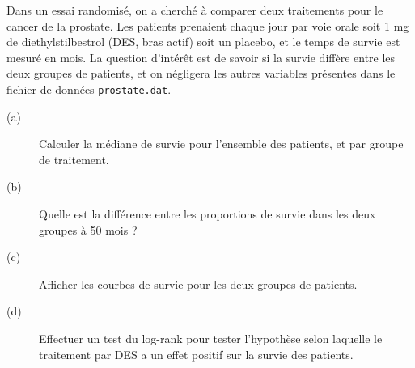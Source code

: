 \begin{exo}\label{exo:7.1}


\end{exo}

\begin{exo}\label{exo:7.2}
Dans un essai randomisé, on a cherché à comparer deux traitements pour le
cancer de la prostate. Les patients prenaient chaque jour par voie orale
soit 1 mg de diethylstilbestrol (DES, bras actif) soit un placebo, et le
temps de survie est mesuré en mois.\autocite{collett94} La question
d'intérêt est de savoir si la survie diffère entre les deux groupes de
patients, et on négligera les autres variables présentes dans le fichier de
données \texttt{prostate.dat}. 
\begin{description}
\item[(a)] Calculer la médiane de survie pour l'ensemble des patients, et
  par groupe de traitement.
\item[(b)] Quelle est la différence entre les proportions de survie dans les
  deux groupes à 50 mois ?
\item[(c)] Afficher les courbes de survie pour les deux groupes de patients.
\item[(d)] Effectuer un test du log-rank pour tester l'hypothèse selon
  laquelle le traitement par DES a un effet positif sur la survie des
  patients. 
\end{description}
\end{exo}

